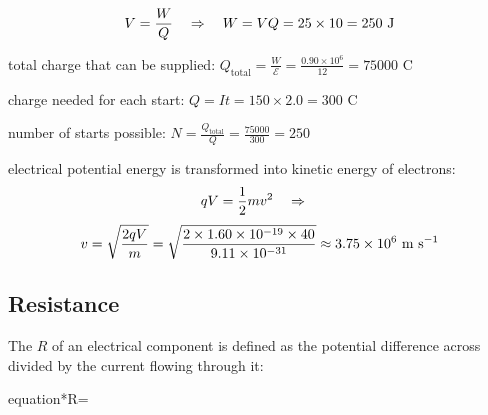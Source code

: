 \begin{soln}\begin{equation*}
	V = \frac{W}{Q} \quad \Rightarrow \quad W = V Q = 25 \times 10 = 250 \text{ J} 
\end{equation*}
\end{soln}

\begin{soln} total charge that can be supplied: $Q_\text{total} = \frac{W}{\mathcal{E}} = \frac{0.90 \times 10^6}{12} = 75000 \text{ C}$

charge needed for each start: $Q = I t = 150 \times 2.0 = 300 \text{ C}$

number of starts possible: $N = \frac{Q_\text{total}}{Q} = \frac{75000}{300} = 250$ \end{soln}


\begin{soln} electrical potential energy is transformed into kinetic energy of electrons:
\begin{equation*}
qV = \frac{1}{2}mv^2 \quad \Rightarrow \quad 
\end{equation*}
\begin{equation*}
v=\sqrt{\frac{2qV}{m}} = \sqrt{\frac{2 \times 1.60 \times 10^{-19} \times 40}{9.11 \times 10^{-31}}} \approx 3.75 \times 10^6 \text{ m s$^{-1}$} 
\end{equation*}
\end{soln}



\subsection{Resistance}

\begin{ilight}
	The  $R$ of an electrical component is defined as the potential difference across divided by the current flowing through it: \begin{empheq}[box=\tcbhighmath]{equation*}{R=} \end{empheq}
\end{ilight}



